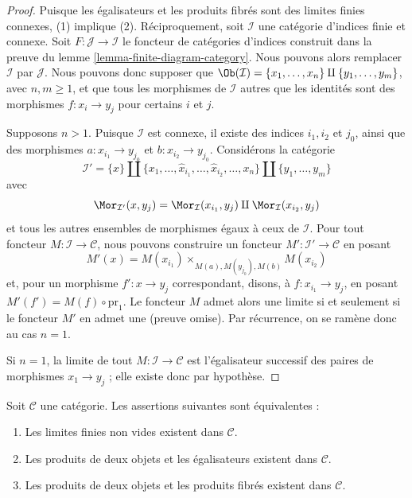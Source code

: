 \begin{proof}
Puisque les égalisateurs et les produits fibrés sont des limites finies
connexes, (1) implique (2). Réciproquement, soit $\mathcal{I}$
une catégorie d'indices finie et connexe. Soit
$F : \mathcal{J} \to \mathcal{I}$
le foncteur de catégories d'indices construit dans la preuve du
lemme \ref{lemma-finite-diagram-category}.
Nous pouvons alors remplacer $\mathcal{I}$ par $\mathcal{J}$.
Nous pouvons donc supposer que
$\Ob(\mathcal{I}) = \{x_1, \ldots, x_n\} \amalg \{y_1, \ldots, y_m\}$,
avec $n, m \geq 1$, et que tous les morphismes de $\mathcal{I}$ autres que les
identités sont des morphismes $f : x_i \to y_j$ pour certains
$i$ et $j$.

\medskip\noindent
Supposons $n > 1$. Puisque $\mathcal{I}$ est connexe, il existe
des indices $i_1, i_2$ et $j_0$, ainsi que des morphismes
$a : x_{i_1} \to y_{j_0}$ et $b : x_{i_2} \to y_{j_0}$.
Considérons la catégorie
$$
\mathcal{I}' =
\{x\} \amalg \{x_1, \ldots, \hat x_{i_1}, \ldots, \hat x_{i_2}, \ldots, x_n\}
\amalg \{y_1, \ldots, y_m\}
$$
avec
$$
\Mor_{\mathcal{I}'}(x, y_j) = \Mor_\mathcal{I}(x_{i_1}, y_j)
\amalg \Mor_\mathcal{I}(x_{i_2}, y_j)
$$
et tous les autres ensembles de morphismes égaux à ceux de
$\mathcal{I}$. Pour tout foncteur
$M : \mathcal{I} \to \mathcal{C}$, nous pouvons construire un foncteur
$M' : \mathcal{I}' \to \mathcal{C}$ en posant
$$
M'(x) = M(x_{i_1}) \times_{M(a), M(y_{j_0}), M(b)} M(x_{i_2})
$$
et, pour un morphisme $f' : x \to y_j$ correspondant, disons, à
$f : x_{i_1} \to y_j$, en posant $M'(f') = M(f) \circ \text{pr}_1$.
Le foncteur $M$ admet alors une limite si et seulement si le foncteur
$M'$ en admet une (preuve omise). Par récurrence, on se ramène donc
au cas $n = 1$.

\medskip\noindent
Si $n = 1$, la limite de tout $M : \mathcal{I} \to \mathcal{C}$ est
l'égalisateur successif des paires de morphismes $x_1 \to y_j$ ;
elle existe donc par hypothèse.
\end{proof}

\begin{lemma}
\label{lemma-almost-finite-limits-exist}
Soit $\mathcal{C}$ une catégorie.
Les assertions suivantes sont équivalentes :
\begin{enumerate}
\item Les limites finies non vides existent dans $\mathcal{C}$.
\item Les produits de deux objets et les égalisateurs existent dans
$\mathcal{C}$.
\item Les produits de deux objets et les produits fibrés existent dans
$\mathcal{C}$.
\end{enumerate}
\end{lemma}

